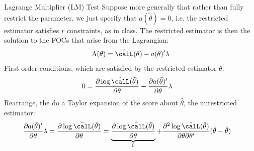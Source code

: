 \documentclass[aspectratio=169, handout]{beamer}
\begin{document}
\begin{frame}{Lagrange Multiplier (LM) Test}
Suppose more generally that rather than fully restrict the parameter, we
just specify that $a(\tilde{\theta})=0$, i.e. the restricted estimator
satisfies $r$ constraints, as in class.
The restricted estimator is then the solution to the FOCs
that arise from the Lagrangian:
\begin{align*}
  \Lambda(\theta)
  =
  \hat{\calL}(\theta)
  -
  a(\theta)'
  \lambda
\end{align*}
First order conditions, which are satisfied by the restricted estimator
$\tilde{\theta}$:
\begin{align*}
  0
  &=
  \frac{%
    \partial \log \hat{\calL}(\tilde{\theta})
  }{%
    \partial\theta
  }
  -
  \frac{\partial a(\tilde{\theta})'}{\partial \theta}
  \lambda
\end{align*}
Rearrange, the do a Taylor expansion of the score about $\hat{\theta}$,
the unrestricted estimator:
\begin{align*}
  \frac{\partial a(\tilde{\theta})'}{\partial \theta}
  \lambda
  =
  \frac{%
    \partial \log \hat{\calL}(\tilde{\theta})
  }{%
    \partial\theta
  }
  &=
  \underbrace{%
    \frac{%
      \partial \log \hat{\calL}(\hat{\theta})
    }{%
      \partial\theta
    }
  }_0
  +
  \frac{%
    \partial^2 \log \hat{\calL}(\hat{\theta})
  }{%
    \partial \theta
    \partial\theta'
  }
  (\tilde{\theta}-\hat{\theta})
\end{align*}



\end{frame}
\end{document}
